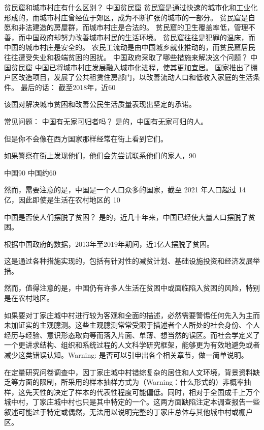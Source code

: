 贫民窟和城市村庄有什么区别？
中国贫民窟
贫民窟是通过快速的城市化和工业化形成的，而城市村庄曾经位于郊区，成为不断扩张的城市的一部分。
贫民窟是自愿和非法建造的房屋群，而城市村庄是合法的。
贫民窟的卫生覆盖率低，管理不善，而中国政府却努力改善城市村民的生活环境。
贫民窟往往是犯罪的温床，而中国的城市村庄是安全的。
农民工流动是由中国城乡就业推动的，而贫民窟居民往往遭受失业和极端贫困的困扰。
中国政府采取了哪些措施来解决这个问题？
中国贫民窟
中国已将城市村庄发展融入城市化进程，使其更加宜居。
国家推出了棚户区改造项目，发展了公共租赁住房部门，以改善流动人口和低收入家庭的生活条件。
最后的话：
截至2018年，近60%

该国对解决城市贫困和改善公民生活质量表现出坚定的承诺。

常见问题：
中国有无家可归者吗？
是的，中国有无家可归的人。

但是你不会像在西方国家那样经常在街上看到它们。

如果警察在街上发现他们，他们会先尝试联系他们的家人，90%

中国90%
中国约60%

然而，需要注意的是，中国是一个人口众多的国家，截至 2021 年人口超过 14 亿，因此即使是生活在农村地区的 10%

中国是否使人们摆脱了贫困？
是的，近几十年来，中国已经使大量人口摆脱了贫困。

根据中国政府的数据，2013年至2019年期间，近1亿人摆脱了贫困。

这是通过各种措施实现的，包括有针对性的减贫计划、基础设施投资和经济发展举措。

然而，值得注意的是，中国仍有许多人生活在贫困中或面临陷入贫困的风险，特别是在农村地区。


如果要对丁家庄城中村进行较为客观和全面的描述，必然需要警惕任何先入为主而未加证实的主观臆测。这些主观臆测常常受限于描述者个人所处的社会身份、个人经历与经验、意识形态取向等而落入片面、单薄、想当然的误区。而社会学定义了一个更讲求结构、组织和系统过程的人文科学研究框架，能够更为有效地避免或者减少这类错误认知。Warning: 是否可以引申出各个相关章节，做一简单说明。

在定量研究问卷调查中，因丁家庄城中村错综复杂的居住和人文环境，背景资料缺乏等方面的限制，所采用的样本抽样方式为（Warning：什么形式的）非概率抽样，这先天性的决定了样本的代表性程度可能偏低。同时，相对于全国成千上万个城中村，丁家庄城中村也只是其中特定的一个。这两方面缺陷注定本调查报告一些叙述可能过于特定或偶然，无法用以说明完整的丁家庄总体与其他城中村或棚户区。

